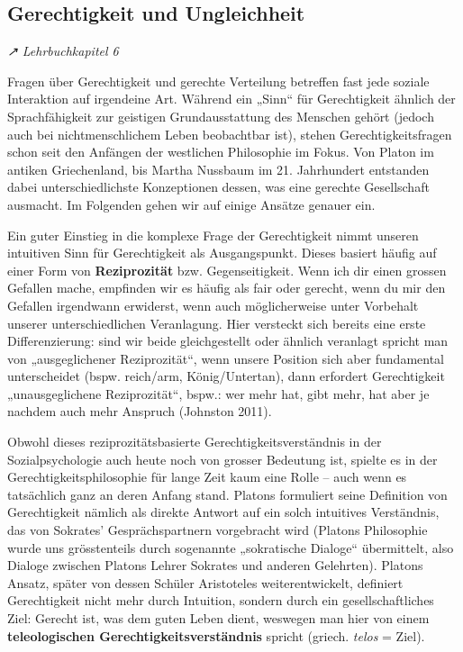 \documentclass[
  nswissgerman,
  a4paper,
  DIV=11,
  numbers=noendperiod,
  oneside,
  openany]{scrreprt}
\begin{document}
\subsection{Gerechtigkeit und
Ungleichheit}\label{gerechtigkeit-und-ungleichheit}

\emph{↗ Lehrbuchkapitel 6}

Fragen über Gerechtigkeit und gerechte Verteilung betreffen fast jede
soziale Interaktion auf irgendeine Art. Während ein „Sinn`` für
Gerechtigkeit ähnlich der Sprachfähigkeit zur geistigen Grundausstattung
des Menschen gehört (jedoch auch bei nichtmenschlichem Leben beobachtbar
ist), stehen Gerechtigkeitsfragen schon seit den Anfängen der westlichen
Philosophie im Fokus. Von Platon im antiken Griechenland, bis Martha
Nussbaum im 21. Jahrhundert entstanden dabei unterschiedlichste
Konzeptionen dessen, was eine gerechte Gesellschaft ausmacht. Im
Folgenden gehen wir auf einige Ansätze genauer ein.

Ein guter Einstieg in die komplexe Frage der Gerechtigkeit nimmt unseren
intuitiven Sinn für Gerechtigkeit als Ausgangspunkt. Dieses basiert
häufig auf einer Form von \textbf{Reziprozität} bzw. Gegenseitigkeit.
Wenn ich dir einen grossen Gefallen mache, empfinden wir es häufig als
fair oder gerecht, wenn du mir den Gefallen irgendwann erwiderst, wenn
auch möglicherweise unter Vorbehalt unserer unterschiedlichen
Veranlagung. Hier versteckt sich bereits eine erste Differenzierung:
sind wir beide gleichgestellt oder ähnlich veranlagt spricht man von
„ausgeglichener Reziprozität``, wenn unsere Position sich aber
fundamental unterscheidet (bspw. reich/arm, König/Untertan), dann
erfordert Gerechtigkeit „unausgeglichene Reziprozität``, bspw.: wer mehr
hat, gibt mehr, hat aber je nachdem auch mehr Anspruch (Johnston 2011).

Obwohl dieses reziprozitätsbasierte Gerechtigkeitsverständnis in der
Sozialpsychologie auch heute noch von grosser Bedeutung ist, spielte es
in der Gerechtigkeitsphilosophie für lange Zeit kaum eine Rolle -- auch
wenn es tatsächlich ganz an deren Anfang stand. Platons formuliert seine
Definition von Gerechtigkeit nämlich als direkte Antwort auf ein solch
intuitives Verständnis, das von Sokrates' Gesprächspartnern vorgebracht
wird (Platons Philosophie wurde uns grösstenteils durch sogenannte
„sokratische Dialoge`` übermittelt, also Dialoge zwischen Platons Lehrer
Sokrates und anderen Gelehrten). Platons Ansatz, später von dessen
Schüler Aristoteles weiterentwickelt, definiert Gerechtigkeit nicht mehr
durch Intuition, sondern durch ein gesellschaftliches Ziel: Gerecht ist,
was dem guten Leben dient, weswegen man hier von einem
\textbf{teleologischen Gerechtigkeitsverständnis} spricht (griech.
\emph{telos} = Ziel).
\end{document}
